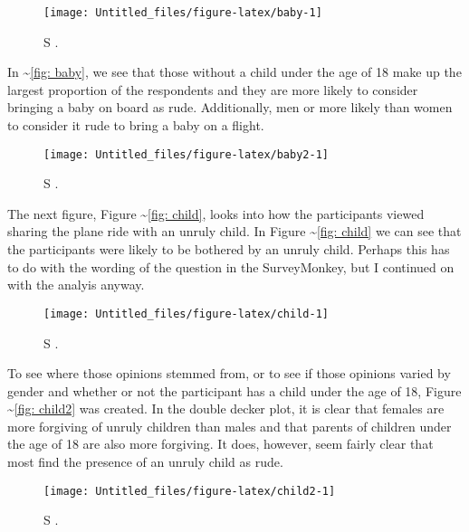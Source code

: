 \begin{Schunk}
\begin{figure}[h]
\texttt{[image: Untitled\_files/figure-latex/baby-1]} \caption[S ]{S .}\label{fig:baby}
\end{figure}
\end{Schunk}

In \textasciitilde{}\ref{fig: baby}, we see that those without a child
under the age of 18 make up the largest proportion of the respondents
and they are more likely to consider bringing a baby on board as rude.
Additionally, men or more likely than women to consider it rude to bring
a baby on a flight.

\begin{Schunk}
\begin{figure}[h]
\texttt{[image: Untitled\_files/figure-latex/baby2-1]} \caption[S ]{S .}\label{fig:baby2}
\end{figure}
\end{Schunk}

The next figure, Figure \textasciitilde{}\ref{fig: child}, looks into
how the participants viewed sharing the plane ride with an unruly child.
In Figure \textasciitilde{}\ref{fig: child} we can see that the
participants were likely to be bothered by an unruly child. Perhaps this
has to do with the wording of the question in the SurveyMonkey, but I
continued on with the analyis anyway.

\begin{Schunk}
\begin{figure}[h]
\texttt{[image: Untitled\_files/figure-latex/child-1]} \caption[S ]{S .}\label{fig:child}
\end{figure}
\end{Schunk}

To see where those opinions stemmed from, or to see if those opinions
varied by gender and whether or not the participant has a child under
the age of 18, Figure \textasciitilde{}\ref{fig: child2} was created. In
the double decker plot, it is clear that females are more forgiving of
unruly children than males and that parents of children under the age of
18 are also more forgiving. It does, however, seem fairly clear that
most find the presence of an unruly child as rude.

\begin{Schunk}
\begin{figure}[h]
\texttt{[image: Untitled\_files/figure-latex/child2-1]} \caption[S ]{S .}\label{fig:child2}
\end{figure}
\end{Schunk}

